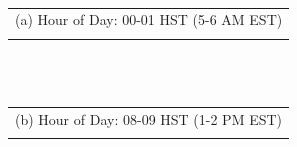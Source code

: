 \documentclass[letterpaper,12pt,titlepage,oneside,final]{book}
\begin{document}
\begin{figure}
\centering
{}
\\
\begin{tabular}{c}
\\(a) Hour of Day: 00-01 HST (5-6 AM EST) \\ \\
\end{tabular}
\\
{}
\\
\begin{tabular}{c}
\\(b) Hour of Day: 08-09 HST (1-2 PM EST) \\ \\
\end{tabular}
\\

\end{figure}
\end{document}
